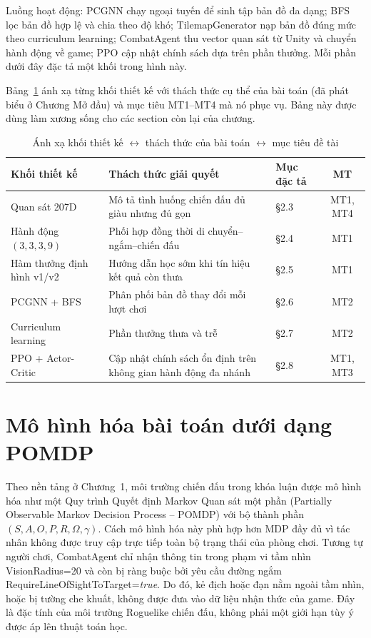 Luồng hoạt động: PCGNN chạy ngoại tuyến để sinh tập bản đồ đa dạng; BFS lọc bản đồ hợp lệ và chia theo độ khó; TilemapGenerator nạp bản đồ đúng mức theo curriculum learning; CombatAgent thu vector quan sát từ Unity và chuyển hành động về game; PPO cập nhật chính sách dựa trên phần thưởng. Mỗi phần dưới đây đặc tả một khối trong hình này.

Bảng~\ref{tab:design_block_mapping} ánh xạ từng khối thiết kế với thách thức cụ thể của bài toán (đã phát biểu ở Chương Mở đầu) và mục tiêu MT1--MT4 mà nó phục vụ. Bảng này được dùng làm xương sống cho các section còn lại của chương.

\begin{table}[H]
    \centering
    \small
    \caption{Ánh xạ khối thiết kế $\leftrightarrow$ thách thức của bài toán $\leftrightarrow$ mục tiêu đề tài}
    \label{tab:design_block_mapping}
    \begin{tabular}{|p{3.4cm}|p{4.5cm}|p{3.5cm}|c|}
        \hline
        \textbf{Khối thiết kế} & \textbf{Thách thức giải quyết} & \textbf{Mục đặc tả} & \textbf{MT} \\
        \hline
        Quan sát 207D & Mô tả tình huống chiến đấu đủ giàu nhưng đủ gọn & §2.3 & MT1, MT4 \\
        \hline
        Hành động $(3,3,3,9)$ & Phối hợp đồng thời di chuyển--ngắm--chiến đấu & §2.4 & MT1 \\
        \hline
        Hàm thưởng định hình v1/v2 & Hướng dẫn học sớm khi tín hiệu kết quả còn thưa & §2.5 & MT1 \\
        \hline
        PCGNN + BFS & Phân phối bản đồ thay đổi mỗi lượt chơi & §2.6 & MT2 \\
        \hline
        Curriculum learning & Phần thưởng thưa và trễ & §2.7 & MT2 \\
        \hline
        PPO + Actor-Critic & Cập nhật chính sách ổn định trên không gian hành động đa nhánh & §2.8 & MT1, MT3 \\
        \hline
    \end{tabular}
\end{table}

\section{Mô hình hóa bài toán dưới dạng POMDP}

Theo nền tảng ở Chương~1, môi trường chiến đấu trong khóa luận được mô hình hóa như một Quy trình Quyết định Markov Quan sát một phần (Partially Observable Markov Decision Process -- POMDP) với bộ thành phần $(S, A, O, P, R, \Omega, \gamma)$. Cách mô hình hóa này phù hợp hơn MDP đầy đủ vì tác nhân không được truy cập trực tiếp toàn bộ trạng thái của phòng chơi. Tương tự người chơi, CombatAgent chỉ nhận thông tin trong phạm vi tầm nhìn VisionRadius=20 và còn bị ràng buộc bởi yêu cầu đường ngắm RequireLineOfSightToTarget=\textit{true}. Do đó, kẻ địch hoặc đạn nằm ngoài tầm nhìn, hoặc bị tường che khuất, không được đưa vào dữ liệu nhận thức của game. Đây là đặc tính của môi trường Roguelike chiến đấu, không phải một giới hạn tùy ý được áp lên thuật toán học.

